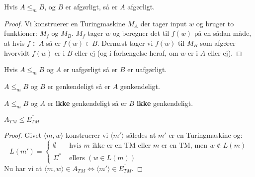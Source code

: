 \begin{theorem}
	Hvis $A \le_{m} B$, og $B$ er afgørligt, så er $A$ afgørligt.
\end{theorem}
\begin{proof}
	Vi konstruerer en Turingmaskine $M_{A}$ der tager input $w$ og bruger to funktioner: $M_{f}$ og $M_{B}$. $M_{f}$ tager $w$ og beregner det til $f(w)$ på en sådan måde, at hvis $f \in A$ så er $f(w) \in B$. Dernæst tager vi $f(w)$ til $M_{B}$ som afgører hvorvidt $f(w)$ er i $B$ eller ej (og i forlængelse heraf, om $w$ er i $A$ eller ej).
\end{proof}

\begin{corollary}
	Hvis $A \le_{m} B$ og $A$ er uafgørligt så er $B$ er uafgørligt.
\end{corollary}
\begin{theorem}
	$A \le_{m} B$ og $B$ er genkendeligt så er $A$ genkendeligt.
\end{theorem}

\begin{corollary}
	$A \le_{m} B$ og $A$ er \textbf{ikke} genkendeligt så er $B$ \textbf{ikke} genkendeligt.
\end{corollary}

\begin{claim}
	$A_{TM} \le  \overline{E_{TM}}$
\end{claim}

\begin{proof}
	Givet \(\langle m , w \rangle \) konstruerer vi $\langle m' \rangle $ således at $m'$ er en Turingmaskine og:
	\begin{equation*}
		L(m') = \begin{cases}
			\emptyset  & \text{ hvis } m \text{ ikke er en TM eller } m \text{ er en TM, men } w \notin L(m) \\
			\Sigma^{*} & \text{ ellers } (w \in L(m))
		\end{cases}
	\end{equation*}
	Nu har vi at \(\langle m, w \rangle \in A_{TM} \iff \langle m' \rangle \in \overline{E_{TM}}\).
\end{proof}

